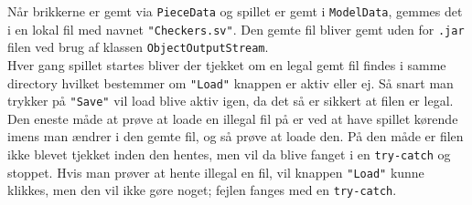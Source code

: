 Når brikkerne er gemt via \texttt{PieceData} og spillet er gemt i \texttt{ModelData}, gemmes det i en lokal fil med navnet \texttt{"Checkers.sv"}. Den gemte fil bliver gemt uden for \texttt{.jar} filen ved brug af klassen \texttt{ObjectOutputStream}.\\

Hver gang spillet startes bliver der tjekket om en legal gemt fil findes i samme directory hvilket bestemmer om \texttt{"Load"} knappen er aktiv eller ej. Så snart man trykker på \texttt{"Save"} vil load blive aktiv igen, da det så er sikkert at filen er legal. \\

Den eneste måde at prøve at loade en illegal fil på er ved at have spillet kørende imens man ændrer i den gemte fil, og så prøve at loade den. På den måde er filen ikke blevet tjekket inden den hentes, men vil da blive fanget i en \texttt{try-catch} og stoppet. Hvis man prøver at hente illegal en fil, vil knappen \texttt{"Load"} kunne klikkes, men den vil ikke gøre noget; fejlen fanges med en \texttt{try-catch}.